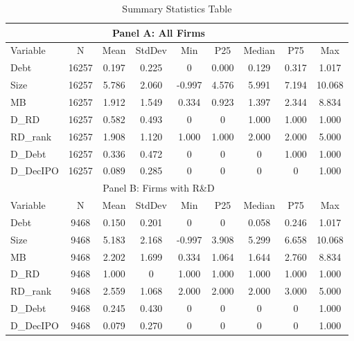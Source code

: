 \documentclass{article}
\begin{document}
\begin{table}[h!]
    \centering
    \caption{Summary Statistics Table}
    \label{table:1}
    \begin{tabular}{lcccccccc}
        \toprule
        \multicolumn{8}{c}{Panel A: All Firms}                                        \\
        \midrule
        Variable  & N     & Mean  & StdDev & Min    & P25   & Median & P75   & Max    \\
        \midrule
        Debt      & 16257 & 0.197 & 0.225  & 0      & 0.000 & 0.129  & 0.317 & 1.017  \\
        Size      & 16257 & 5.786 & 2.060  & -0.997 & 4.576 & 5.991  & 7.194 & 10.068 \\
        MB        & 16257 & 1.912 & 1.549  & 0.334  & 0.923 & 1.397  & 2.344 & 8.834  \\
        D\_RD     & 16257 & 0.582 & 0.493  & 0      & 0     & 1.000  & 1.000 & 1.000  \\
        RD\_rank  & 16257 & 1.908 & 1.120  & 1.000  & 1.000 & 2.000  & 2.000 & 5.000  \\
        D\_Debt   & 16257 & 0.336 & 0.472  & 0      & 0     & 0      & 1.000 & 1.000  \\
        D\_DecIPO & 16257 & 0.089 & 0.285  & 0      & 0     & 0      & 0     & 1.000  \\
        \midrule
        \multicolumn{8}{c}{Panel B: Firms with R\&D}                                  \\
        \midrule
        Variable  & N     & Mean  & StdDev & Min    & P25   & Median & P75   & Max    \\
        \midrule
        Debt      & 9468  & 0.150 & 0.201  & 0      & 0     & 0.058  & 0.246 & 1.017  \\
        Size      & 9468  & 5.183 & 2.168  & -0.997 & 3.908 & 5.299  & 6.658 & 10.068 \\
        MB        & 9468  & 2.202 & 1.699  & 0.334  & 1.064 & 1.644  & 2.760 & 8.834  \\
        D\_RD     & 9468  & 1.000 & 0      & 1.000  & 1.000 & 1.000  & 1.000 & 1.000  \\
        RD\_rank  & 9468  & 2.559 & 1.068  & 2.000  & 2.000 & 2.000  & 3.000 & 5.000  \\
        D\_Debt   & 9468  & 0.245 & 0.430  & 0      & 0     & 0      & 0     & 1.000  \\
        D\_DecIPO & 9468  & 0.079 & 0.270  & 0      & 0     & 0      & 0     & 1.000  \\

\end{tabular}
\end{table}
\end{document}
